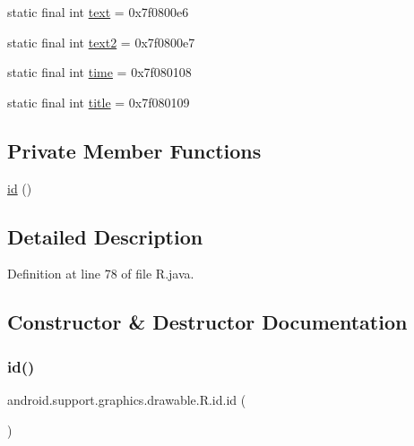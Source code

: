 \begin{DoxyCompactItemize}
\item 
static final int \mbox{\hyperlink{classandroid_1_1support_1_1graphics_1_1drawable_1_1_r_1_1id_ac94c4446921fcc3809b45b4192e599b8}{text}} = 0x7f0800e6
\item 
static final int \mbox{\hyperlink{classandroid_1_1support_1_1graphics_1_1drawable_1_1_r_1_1id_a8497c10b90e0af758ebfd8117e7fed2f}{text2}} = 0x7f0800e7
\item 
static final int \mbox{\hyperlink{classandroid_1_1support_1_1graphics_1_1drawable_1_1_r_1_1id_a7083b3897e0b0ff17169442245632f35}{time}} = 0x7f080108
\item 
static final int \mbox{\hyperlink{classandroid_1_1support_1_1graphics_1_1drawable_1_1_r_1_1id_ae4c46d15d4cdd1b6504115837b34d591}{title}} = 0x7f080109
\end{DoxyCompactItemize}
\subsection*{Private Member Functions}
\begin{DoxyCompactItemize}
\item 
\mbox{\hyperlink{classandroid_1_1support_1_1graphics_1_1drawable_1_1_r_1_1id_ae05b98b859825ce7a650d532477ab9e9}{id}} ()
\end{DoxyCompactItemize}


\subsection{Detailed Description}


Definition at line 78 of file R.\+java.



\subsection{Constructor \& Destructor Documentation}
\mbox{\label{classandroid_1_1support_1_1graphics_1_1drawable_1_1_r_1_1id_ae05b98b859825ce7a650d532477ab9e9}} 
\subsubsection{\texorpdfstring{id()}{id()}}
{\footnotesize\ttfamily android.\+support.\+graphics.\+drawable.\+R.\+id.\+id (\begin{DoxyParamCaption}{ }\end{DoxyParamCaption})\hspace{0.3cm}{\ttfamily [private]}}



